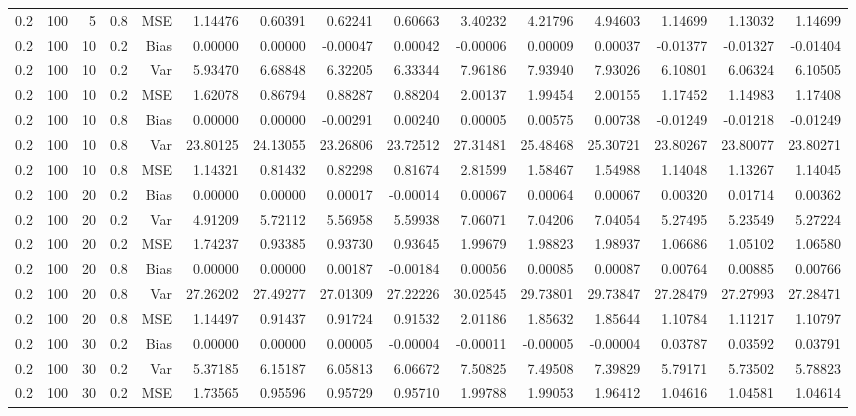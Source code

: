 \begin{table}[!htbp]
\begin{tabular}{lrrrrrrrrrrrrrr}
0.2 & 100 &  5 & 0.8 & MSE & 1.14476 & 0.60391 & 0.62241 & 0.60663 & 3.40232 & 4.21796 & 4.94603 & 1.14699 & 1.13032 & 1.14699 \\
0.2 & 100 & 10 & 0.2 & Bias & 0.00000 & 0.00000 & -0.00047 & 0.00042 & -0.00006 & 0.00009 & 0.00037 & -0.01377 & -0.01327 & -0.01404 \\
0.2 & 100 & 10 & 0.2 & Var & 5.93470 & 6.68848 & 6.32205 & 6.33344 & 7.96186 & 7.93940 & 7.93026 & 6.10801 & 6.06324 & 6.10505 \\
0.2 & 100 & 10 & 0.2 & MSE & 1.62078 & 0.86794 & 0.88287 & 0.88204 & 2.00137 & 1.99454 & 2.00155 & 1.17452 & 1.14983 & 1.17408 \\
0.2 & 100 & 10 & 0.8 & Bias & 0.00000 & 0.00000 & -0.00291 & 0.00240 & 0.00005 & 0.00575 & 0.00738 & -0.01249 & -0.01218 & -0.01249 \\
0.2 & 100 & 10 & 0.8 & Var & 23.80125 & 24.13055 & 23.26806 & 23.72512 & 27.31481 & 25.48468 & 25.30721 & 23.80267 & 23.80077 & 23.80271 \\
0.2 & 100 & 10 & 0.8 & MSE & 1.14321 & 0.81432 & 0.82298 & 0.81674 & 2.81599 & 1.58467 & 1.54988 & 1.14048 & 1.13267 & 1.14045 \\
0.2 & 100 & 20 & 0.2 & Bias & 0.00000 & 0.00000 & 0.00017 & -0.00014 & 0.00067 & 0.00064 & 0.00067 & 0.00320 & 0.01714 & 0.00362 \\
0.2 & 100 & 20 & 0.2 & Var & 4.91209 & 5.72112 & 5.56958 & 5.59938 & 7.06071 & 7.04206 & 7.04054 & 5.27495 & 5.23549 & 5.27224 \\
0.2 & 100 & 20 & 0.2 & MSE & 1.74237 & 0.93385 & 0.93730 & 0.93645 & 1.99679 & 1.98823 & 1.98937 & 1.06686 & 1.05102 & 1.06580 \\
0.2 & 100 & 20 & 0.8 & Bias & 0.00000 & 0.00000 & 0.00187 & -0.00184 & 0.00056 & 0.00085 & 0.00087 & 0.00764 & 0.00885 & 0.00766 \\
0.2 & 100 & 20 & 0.8 & Var & 27.26202 & 27.49277 & 27.01309 & 27.22226 & 30.02545 & 29.73801 & 29.73847 & 27.28479 & 27.27993 & 27.28471 \\
0.2 & 100 & 20 & 0.8 & MSE & 1.14497 & 0.91437 & 0.91724 & 0.91532 & 2.01186 & 1.85632 & 1.85644 & 1.10784 & 1.11217 & 1.10797 \\
0.2 & 100 & 30 & 0.2 & Bias & 0.00000 & 0.00000 & 0.00005 & -0.00004 & -0.00011 & -0.00005 & -0.00004 & 0.03787 & 0.03592 & 0.03791 \\
0.2 & 100 & 30 & 0.2 & Var & 5.37185 & 6.15187 & 6.05813 & 6.06672 & 7.50825 & 7.49508 & 7.39829 & 5.79171 & 5.73502 & 5.78823 \\
0.2 & 100 & 30 & 0.2 & MSE & 1.73565 & 0.95596 & 0.95729 & 0.95710 & 1.99788 & 1.99053 & 1.96412 & 1.04616 & 1.04581 & 1.04614 \\

\end{tabular}
\end{table}
